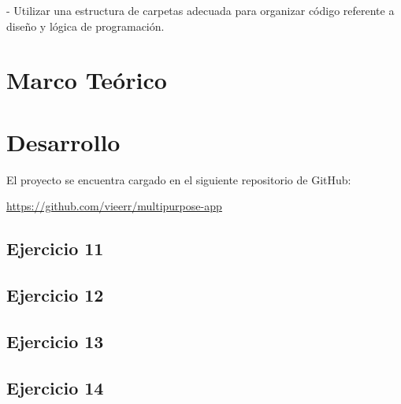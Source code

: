 \documentclass[12pt,letterpaper]{article}
\begin{document}
- Utilizar una estructura de carpetas adecuada para organizar código referente a diseño y lógica de programación.


\section{Marco Teórico}



\section{Desarrollo}

El proyecto se encuentra cargado en el siguiente repositorio de GitHub: 

\href{https://github.com/vieerr/multipurpose-app}{\color{blue}\underline{https://github.com/vieerr/multipurpose-app}}



\subsection{Ejercicio 11}


\subsection{Ejercicio 12}


\subsection{Ejercicio 13}


\subsection{Ejercicio 14}

\end{document}
